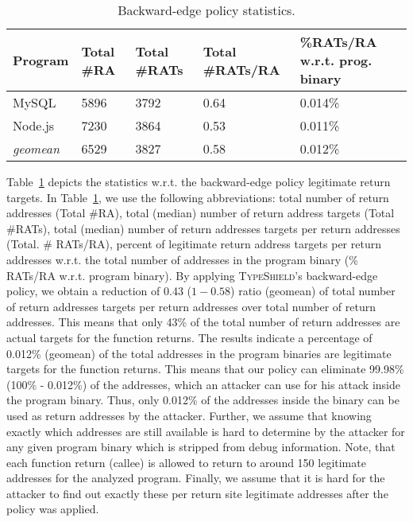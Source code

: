 \begin{table}[H]
\centering 
 \begin{tabular}{ l | p{.7cm}  | p{.9cm}  | p{1.0cm}  | p{1.8cm} } 
  \textbf{Program}  & Total \#RA    & Total \#RATs  & Total \#RATs/RA  & \%RATs/RA w.r.t. prog. binary \\\hline 
  MySQL             & 5896          & 3792          & 0.64             & 0.014\%                       \\
  Node.js           & 7230          & 3864          & 0.53             & 0.011\%                       \\
  \textit{geomean}  & 6529          & 3827          & 0.58             & 0.012\%                       \\\hline
\end{tabular}
\caption{Backward-edge policy statistics.}
\label{Backward-edge policy statistics.}
\end{table}
Table~\ref{Backward-edge policy statistics.} depicts the statistics w.r.t. the backward-edge policy legitimate return targets.
In Table~\ref{Backward-edge policy statistics.}, we use the following abbreviations:
total number of return addresses (Total \#RA),
total (median) number of return address targets (Total \#RATs),
total (median) number of return addresses targets per return addresses (Total. \# RATs/RA),
percent of legitimate return address targets per return addresses w.r.t. the total number of addresses in the program binary (\% RATs/RA w.r.t. program binary).
By applying \textsc{TypeShield}'s backward-edge policy, we obtain a reduction of 0.43 ($1-0.58$) ratio (geomean)
of total number of return addresses targets per return addresses over total number of return addresses. This means that only 43\% of the total number of return addresses are actual targets
for the function returns. The results indicate a percentage of 0.012\% (geomean) of the total addresses in the program binaries are legitimate targets for the function returns. This means
that our policy can eliminate 99.98\% (100\% - 0.012\%) of the addresses, which an attacker can use for his attack inside the program binary.
Thus, only 0.012\% of the addresses inside
the binary can be used as return addresses by the attacker.
Further, we assume that knowing exactly which addresses are
still available is hard to determine by the attacker for any given
program binary which is stripped from debug information.
Note, that each function return (callee) is allowed to return
to around 150 legitimate addresses for the analyzed program.
Finally, we assume that it is hard for the attacker to find
out exactly these per return site legitimate addresses after the
policy was applied.

